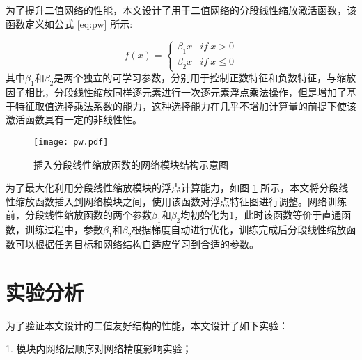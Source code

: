 

为了提升二值网络的性能，本文设计了用于二值网络的分段线性缩放激活函数，该函数定义如公式 \eqref{eq:pw} 所示:

\begin{equation}
  \label{eq:pw}
  f(x) =
  \begin{cases}
    \beta_1 x & if \ x > 0 \\
    \beta_2 x & if \ x \leq 0
  \end{cases}
\end{equation}
其中$\beta_1$和$\beta_2$是两个独立的可学习参数，分别用于控制正数特征和负数特征，与缩放因子相比，分段线性缩放同样逐元素进行一次逐元素浮点乘法操作，但是增加了基于特征取值选择乘法系数的能力，这种选择能力在几乎不增加计算量的前提下使该激活函数具有一定的非线性性。

\begin{figure}[htb]
  \vspace{6pt}
  \centering
  \texttt{[image: pw.pdf]}
  \caption{插入分段线性缩放函数的网络模块结构示意图}
  \label{fig:pw_block}
\end{figure}

为了最大化利用分段线性缩放模块的浮点计算能力，如图 \ref{fig:pw_block} 所示，本文将分段线性缩放函数插入到网络模块之间，使用该函数对浮点特征图进行调整。网络训练前，分段线性缩放函数的两个参数$\beta_1$和$\beta_2$均初始化为1，此时该函数等价于直通函数，训练过程中，参数$\beta_1$和$\beta_2$根据梯度自动进行优化，训练完成后分段线性缩放函数可以根据任务目标和网络结构自适应学习到合适的参数。

\section{实验分析}

为了验证本文设计的二值友好结构的性能，本文设计了如下实验：

1. 模块内网络层顺序对网络精度影响实验；

